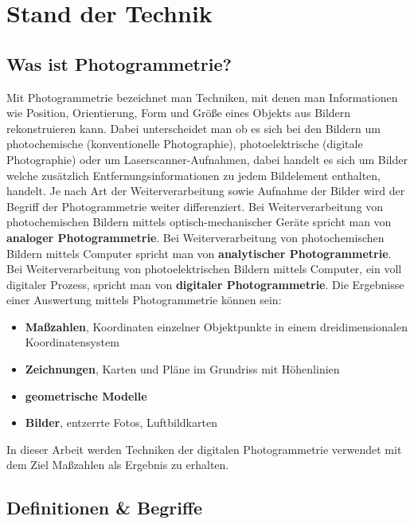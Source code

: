 
\chapter{Stand der Technik}

\section{Was ist Photogrammetrie?}
Mit Photogrammetrie bezeichnet man Techniken, mit denen man Informationen wie Position, Orientierung, Form und Größe eines Objekts aus Bildern rekonstruieren kann.
Dabei unterscheidet man ob es sich bei den Bildern um photochemische (konventionelle Photographie), photoelektrische (digitale Photographie) oder um Laserscanner-Aufnahmen, dabei handelt es sich um Bilder welche zusätzlich Entfernungsinformationen zu jedem Bildelement enthalten, handelt.
Je nach Art der Weiterverarbeitung sowie Aufnahme der Bilder wird der Begriff der Photogrammetrie weiter differenziert.
Bei Weiterverarbeitung von photochemischen Bildern mittels optisch-mechanischer Geräte spricht man von \textbf{analoger Photogrammetrie}.
Bei Weiterverarbeitung von photochemischen Bildern mittels Computer spricht man von \textbf{analytischer Photogrammetrie}.
Bei Weiterverarbeitung von photoelektrischen Bildern mittels Computer, ein voll digitaler Prozess, spricht man von \textbf{digitaler Photogrammetrie}.
Die Ergebnisse einer Auswertung mittels Photogrammetrie können sein: \cite[Kapitel 1.1]{kraus_2004}
\begin{itemize}
\item \textbf{Maßzahlen}, Koordinaten einzelner Objektpunkte in einem dreidimensionalen Koordinatensystem
\item \textbf{Zeichnungen}, Karten und Pläne im Grundriss mit Höhenlinien
\item \textbf{geometrische Modelle}
\item \textbf{Bilder}, entzerrte Fotos, Luftbildkarten
\end{itemize}

In dieser Arbeit werden Techniken der digitalen Photogrammetrie verwendet mit dem Ziel Maßzahlen als Ergebnis zu erhalten.

\section{Definitionen \& Begriffe}

